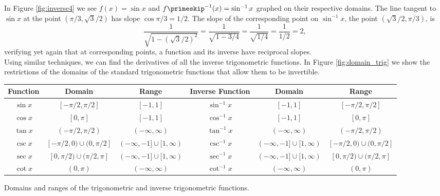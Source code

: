

In Figure \ref{fig:inverse4} we see $f(x) = \sin x$ and $f\primeskip^{-1}(x) = \sin^{-1} x$ graphed on their respective domains. The line tangent to $\sin x$ at the point $(\pi/3, \sqrt{3}/2)$ has slope $\cos \pi/3 = 1/2$. The slope of the corresponding point on $\sin^{-1}x$, the point $(\sqrt{3}/2,\pi/3)$, is $$\frac{1}{\sqrt{1-(\sqrt{3}/2)^2}} = \frac{1}{\sqrt{1-3/4}} = \frac{1}{\sqrt{1/4}} = \frac{1}{1/2}=2,$$ verifying yet again that at corresponding points, a function and its inverse have reciprocal slopes.\\

Using similar techniques, we can find the derivatives of all the inverse trigonometric functions. In Figure \ref{fig:domain_trig} we show the restrictions of the domains of the standard trigonometric functions that allow them to be invertible.\\

\noindent\hskip-110pt%
\noindent\begin{minipage}{\textwidth+200pt}
\small\noindent
\begin{tabular}{cccccc}
Function & Domain & Range &\parbox[b]{40pt}{\centering Inverse Function} & Domain & Range\\ \hline
\rule{0pt}{12pt} $\sin x$ & $[-\pi/2, \pi/2]$ & $[-1,1]$&$\sin^{-1} x$ & $[-1,1]$ & $[-\pi/2, \pi/2]$ \\
\rule{0pt}{12pt}$\cos x$ & $[0,\pi]$ & $[-1,1]$&$\cos^{-1} x $ & $[-1,1]$ & $[0,\pi]$ \\
\rule{0pt}{12pt}$\tan x$ & $(-\pi/2,\pi/2)$ & $(-\infty,\infty)$&$\tan^{-1} x $ & $(-\infty,\infty)$ & $(-\pi/2,\pi/2)$	\\
\rule{0pt}{12pt} $\csc x$ & $[-\pi/2,0)\cup (0, \pi/2]$ & $(-\infty,-1]\cup [1,\infty)$&$\csc^{-1} x$ & $(-\infty,-1]\cup [1,\infty)$ & $[-\pi/2,0)\cup (0, \pi/2]$  \\
\rule{0pt}{12pt}$\sec x$ & $[0,\pi/2)\cup (\pi/2,\pi]$ & $(-\infty,-1]\cup [1,\infty)$&$\sec^{-1} x$ & $(-\infty,-1]\cup [1,\infty)$ & $[0,\pi/2)\cup (\pi/2,\pi]$ \\
\rule{0pt}{12pt}$\cot x$ & $(0,\pi)$ & $(-\infty,\infty)$&$\cot^{-1} x $ &  $ (-\infty,\infty)$ & $(0,\pi)$	
\end{tabular}
\captionsetup{type=figure}
\caption{Domains and ranges of the trigonometric and inverse trigonometric functions.}\label{fig:domain_trig}
\end{minipage}

